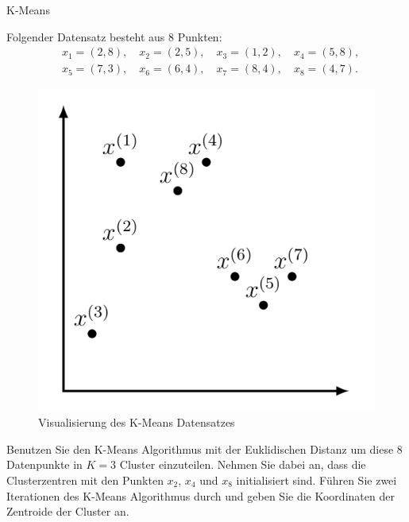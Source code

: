 \begin{task}[credit=6]{K-Means}

Folgender Datensatz besteht aus $8$ Punkten:
\begin{equation}
 \begin{aligned}
&x_1=(2,8), \quad x_2=(2,5),\quad x_3=(1,2), \quad x_4=(5,8),\\
&x_5=(7,3), \quad x_6=(6,4),\quad x_7=(8,4), \quad x_8=(4,7).
 \end{aligned}
\end{equation}

\begin{figure}[h!]
\centering
\includegraphics[width=0.4\linewidth]{media/images/kmeans.png}
\caption{Visualisierung des K-Means Datensatzes}
\end{figure}

\begin{subtask}[points=6,title={K-Means Algorithmus}]
Benutzen Sie den K-Means Algorithmus mit der Euklidischen Distanz um diese $8$ Datenpunkte in $K=3$ Cluster einzuteilen.
Nehmen Sie dabei an, dass die Clusterzentren mit den Punkten $x_2$, $x_4$ und $x_8$ initialisiert sind.
Führen Sie zwei Iterationen des K-Means Algorithmus durch und geben Sie die Koordinaten der Zentroide der Cluster an.

\begin{solution}
\end{solution}

\end{subtask}

\end{task}

